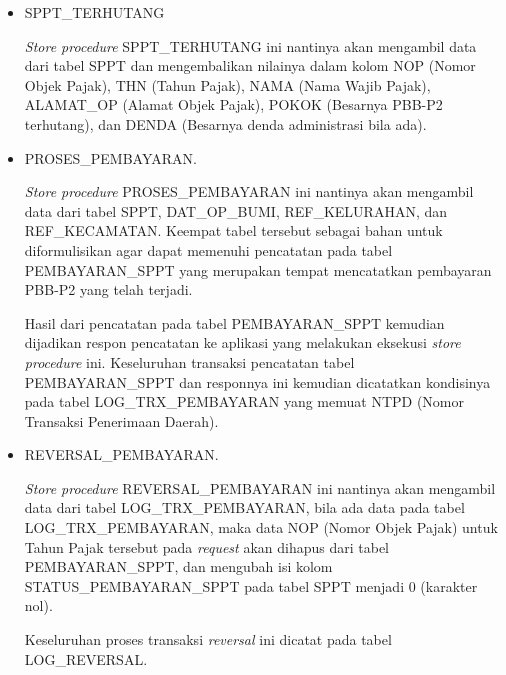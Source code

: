 \begin{itemize}
  \item SPPT\_TERHUTANG
  
    \textit{Store procedure} SPPT\_TERHUTANG ini nantinya akan mengambil data dari tabel SPPT dan mengembalikan nilainya dalam kolom NOP (Nomor Objek Pajak), THN (Tahun Pajak), NAMA (Nama Wajib Pajak), ALAMAT\_OP (Alamat Objek Pajak), POKOK (Besarnya PBB-P2 terhutang), dan DENDA (Besarnya denda administrasi bila ada).

  \item PROSES\_PEMBAYARAN. 
  
    \textit{Store procedure} PROSES\_PEMBAYARAN ini nantinya akan mengambil data dari tabel SPPT, DAT\_OP\_BUMI, REF\_KELURAHAN, dan REF\_KECAMATAN. Keempat tabel tersebut sebagai bahan untuk diformulisikan agar dapat memenuhi pencatatan pada tabel PEMBAYARAN\_SPPT yang merupakan tempat mencatatkan pembayaran PBB-P2 yang telah terjadi.
  
    Hasil dari pencatatan pada tabel PEMBAYARAN\_SPPT kemudian dijadikan respon pencatatan ke aplikasi yang melakukan eksekusi \textit{store procedure} ini. Keseluruhan transaksi pencatatan tabel PEMBAYARAN\_SPPT dan responnya ini kemudian dicatatkan kondisinya pada tabel LOG\_TRX\_PEMBAYARAN yang memuat NTPD (Nomor Transaksi Penerimaan Daerah).

  \item REVERSAL\_PEMBAYARAN.
  
    \textit{Store procedure} REVERSAL\_PEMBAYARAN ini nantinya akan mengambil data dari tabel LOG\_TRX\_PEMBAYARAN, bila ada data pada tabel LOG\_TRX\_PEMBAYARAN, maka data NOP (Nomor Objek Pajak) untuk Tahun Pajak tersebut pada \textit{request} akan dihapus dari tabel PEMBAYARAN\_SPPT, dan mengubah isi kolom STATUS\_PEMBAYARAN\_SPPT pada tabel SPPT menjadi 0 (karakter nol).
    
    Keseluruhan proses transaksi \textit{reversal} ini dicatat pada tabel LOG\_REVERSAL.
\end{itemize}